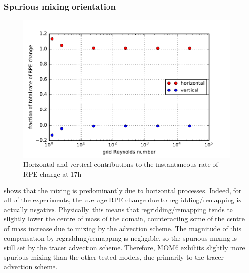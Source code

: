 \subsubsection{Spurious mixing orientation}
\begin{figure}
  \includegraphics{../plots/lock_exchange_drpe_split.pdf}
  \caption{\label{fig:lock-rpesplit} Horizontal and vertical contributions to the instantaneous rate of RPE change at 17h}
\end{figure}

 shows that the mixing is predominantly due to horizontal processes. Indeed, for all of the experiments, the average RPE change due to regridding/remapping is actually negative. Physically, this means that regridding/remapping tends to slightly lower the centre of mass of the domain, counteracting some of the centre of mass increase due to mixing by the advection scheme. The magnitude of this compensation by regridding/remapping is negligible, so the spurious mixing is still set by the tracer advection scheme. Therefore, MOM6 exhibits slightly more spurious mixing than the other tested models, due primarily to the tracer advection scheme.
